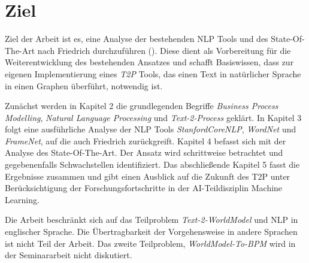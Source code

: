 \section{Ziel}
\label{SUBSEC:ZIEL}
Ziel der Arbeit ist es, eine Analyse der bestehenden \ac{NLP} Tools und des State-Of-The-Art nach Friedrich durchzuführen (\cite[vgl.][]{FRIEDRICH1}). Diese dient als Vorbereitung für die Weiterentwicklung des bestehenden Ansatzes und schafft Basiswissen, dass zur eigenen Implementierung eines \textit{\ac{T2P}} Tools, das einen Text in natürlicher Sprache in einen Graphen überführt, notwendig ist.

Zunächst werden in Kapitel 2 die grundlegenden Begriffe \textit{Business Process Modelling}, \textit{Natural Language Processing} und \textit{Text-2-Process} geklärt. In Kapitel 3 folgt eine ausführliche Analyse der \ac{NLP} Tools \textit{StanfordCoreNLP}, \textit{WordNet} und \textit{FrameNet}, auf die auch Friedrich zurückgreift. Kapitel 4 befasst sich mit der Analyse des State-Of-The-Art. Der Ansatz wird schrittweise betrachtet und gegebenenfalls Schwachstellen identifiziert. Das abschließende Kapitel 5 fasst die Ergebnisse zusammen und gibt einen Ausblick auf die Zukunft des \ac{T2P} unter Berücksichtigung der Forschungsfortschritte in der \ac{AI}-Teildisziplin Machine Learning.

Die Arbeit beschränkt sich auf das Teilproblem \textit{Text-2-WorldModel} und \ac{NLP} in englischer Sprache. Die Übertragbarkeit der Vorgehensweise in andere Sprachen ist nicht Teil der Arbeit. Das zweite Teilproblem, \textit{WorldModel-To-BPM} wird in der Seminararbeit nicht diskutiert.
